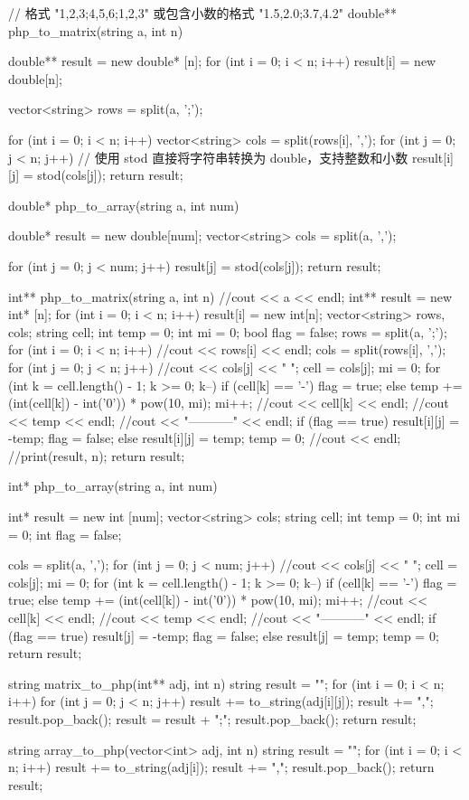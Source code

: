 \documentclass[withoutpreface,bwprint]{cumcmthesis} %
\begin{document}
\begin{appendices}
\begin{tcode}
// 格式 "1,2,3;4,5,6;1,2,3" 或包含小数的格式 "1.5,2.0;3.7,4.2"
double** php_to_matrix(string a, int n) {
    double** result = new double* [n];
    for (int i = 0; i < n; i++) {
        result[i] = new double[n];
    }

    vector<string> rows = split(a, ';');

    for (int i = 0; i < n; i++) {
        vector<string> cols = split(rows[i], ',');
        for (int j = 0; j < n; j++) {
            // 使用 stod 直接将字符串转换为 double，支持整数和小数
            result[i][j] = stod(cols[j]);
        }
    }
    return result;
}

double* php_to_array(string a, int num) {
    double* result = new double[num];
    vector<string> cols = split(a, ',');

    for (int j = 0; j < num; j++) {
        result[j] = stod(cols[j]);
    }
    return result;
}

int** php_to_matrix(string a, int n) {
	//cout << a << endl;
	int** result = new int* [n];
	for (int i = 0; i < n; i++) result[i] = new int[n];
	vector<string> rows, cols;
	string cell;
	int temp = 0;
	int mi = 0;
	bool flag = false;
	rows = split(a, ';');
	for (int i = 0; i < n; i++) {
		//cout << rows[i] << endl;
		cols = split(rows[i], ',');
		for (int j = 0; j < n; j++) {
			//cout << cols[j] << " ";
			cell = cols[j];
			mi = 0;
			for (int k = cell.length() - 1; k >= 0; k--) {
				if (cell[k] == '-') flag = true;
				else {
					temp += (int(cell[k]) - int('0')) * pow(10, mi);
					mi++;
				}
				//cout << cell[k] << endl;
				//cout << temp << endl;
				//cout << "-----------" << endl;
			}
			if (flag == true) {
				result[i][j] = -temp;
				flag = false;
			}
			else result[i][j] = temp;
			temp = 0;
		}
		//cout << endl;
	}
	//print(result, n);
	return result;
}

int* php_to_array(string a, int num) {
	int* result = new int [num];
	vector<string> cols;
	string cell;
	int temp = 0;
	int mi = 0;
	int flag = false;

	cols = split(a, ',');
	for (int j = 0; j < num; j++) {
		//cout << cols[j] << " ";
		cell = cols[j];
		mi = 0;
		for (int k = cell.length() - 1; k >= 0; k--) {
			if (cell[k] == '-') flag = true;
			else {
				temp += (int(cell[k]) - int('0')) * pow(10, mi);
				mi++;
			}
			//cout << cell[k] << endl;
			//cout << temp << endl;
			//cout << "-----------" << endl;
		}
		if (flag == true) {
			result[j] = -temp;
			flag = false;
		}
		else result[j] = temp;
		temp = 0;
	}
	return result;
}


string matrix_to_php(int** adj, int n) {
	string result = "";
	for (int i = 0; i < n; i++) {
		for (int j = 0; j < n; j++) {
			result += to_string(adj[i][j]);
			result += ",";
		}
		result.pop_back();
		result = result + ";";
	}
	result.pop_back();
	return result;
}

string array_to_php(vector<int> adj, int n) {
	string result = "";
	for (int i = 0; i < n; i++) {
		result += to_string(adj[i]);
		result += ",";
	}
	result.pop_back();
	return result;
}


\end{tcode}


\end{appendices}
\end{document}
